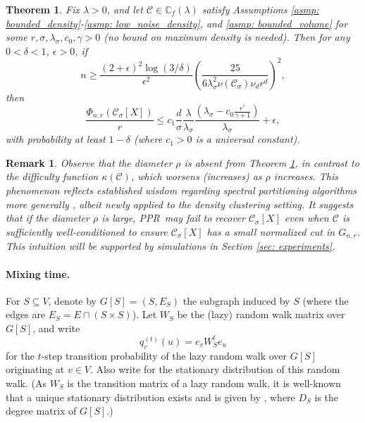 \documentclass{article}
\newcommand{\vol}{\mathrm{vol}}
\newcommand{\1}{\mathbf{1}}
\newcommand{\Xbf}{X}             %
\newcommand{\Wbf}{W}
\newcommand{\Dbf}{D}
\newcommand{\Cbb}{\mathbb{C}}
\newcommand{\Cset}{\mathcal{C}}
\newcommand{\Csig}{\Cset_{\sigma}}
\newcommand{\pprspace}{{\sc PPR~}}
\theoremstyle{aldenthm}
\newtheorem{theorem}{Theorem}
\theoremstyle{aldenrmrk}
\newtheorem{remark}{Remark}
\begin{document}
\begin{theorem}
	\label{thm: conductance_upper_bound}
	Fix $\lambda > 0$, and let $\Cset \in \Cbb_f(\lambda)$ satisfy
	Assumptions \ref{asmp: bounded_density}-\ref{asmp: low_noise_density}, and \ref{asmp: bounded_volume} for some 
	$r, \sigma, \lambda_{\sigma}, c_0, \gamma > 0$ (no bound on maximum density is needed). 
	Then for any $0 < \delta < 1$, $\epsilon > 0$, if
	\begin{equation}
	\label{eqn: conductance_sample_complexity}
	n \geq \frac{(2+\epsilon)^2\log(3/\delta)}{\epsilon^2}\left(\frac{25}
	{6 \lambda_{\sigma}^2\nu(\Csig) \nu_d r^d}\right)^2,
	\end{equation}
	then
	\begin{equation}
	\label{eqn: conductance_additive_error_bound}
	\frac{\Phi_{n,r}(\Csig[\Xbf])}{r} \leq c_1 \frac{d}{\sigma}
	\frac{\lambda}{\lambda_{\sigma}} \frac{(\lambda_{\sigma} -
		c_0\frac{r^{\gamma}}{\gamma+1})}{\lambda_{\sigma}} + \epsilon, 
	\end{equation}
	with probability at least $1-\delta$ (where $c_1 > 0$ is a universal constant).
\end{theorem}

\begin{remark}
	\label{rmk: diameter}
	Observe that the diameter $\rho$ is absent from Theorem \ref{thm: conductance_upper_bound}, in contrast to the difficulty function $\kappa(\Cset)$, which worsens (increases) as $\rho$ increases. This phenomenon reflects established wisdom regarding spectral partitioning algorithms more generally \cite{guattery1995, hein2010}, albeit newly applied to the density clustering setting. It suggests that if the diameter $\rho$ is large, \pprspace may fail to recover $\Csig[\Xbf]$ even when $\Cset$ is sufficiently well-conditioned to ensure $\Csig[\Xbf]$ has a small normalized cut in $G_{n,r}$. This intuition will be supported by simulations in Section \ref{sec: experiments}.
\end{remark}

\paragraph{Mixing time.}
For $S \subseteq V$, denote by $G[S] = (S, E_S)$ the subgraph induced by 
$S$ (where the edges are $E_S = E \cap (S \times S)$). Let $\Wbf_S$ be the (lazy) random walk matrix over $G[S]$, and write 
$$
q_{v}^{(t)}(u) = e_v\Wbf_S^t e_u
$$
for the $t$-step transition probability of the lazy random walk over $G[S]$
originating at $v \in V$. Also write 
for the stationary distribution of this random walk.  (As
$\Wbf_S$ is the transition matrix of a lazy random walk, it is well-known that a unique stationary distribution exists and is given by
\smash{$\pi(u) = (\Dbf_S)_{uu}/\vol(S; G[S])$}, where $\Dbf_S$ is the degree matrix of $G[S]$.)
\end{document}

